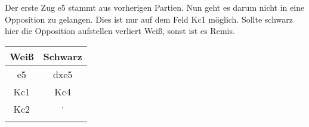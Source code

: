 
Der erste Zug e5 stammt aus vorherigen Partien. Nun geht es darum nicht in eine Opposition zu gelangen. Dies ist nur auf dem Feld Kc1 möglich. Sollte schwarz hier die Opposition aufstellen verliert Weiß, sonst ist es Remis. \\
\centering
\begin{tabular}[h]{c|c}
	\textbf{Weiß}  & \textbf{Schwarz} \\
	\hline
	e5 & dxe5\\
	Kc1 & Kc4 \\ 
	Kc2 & $\cdot$ \\
	\unterstreichen{\Remis} & \unterstreichen{\Remis}
\end{tabular}


